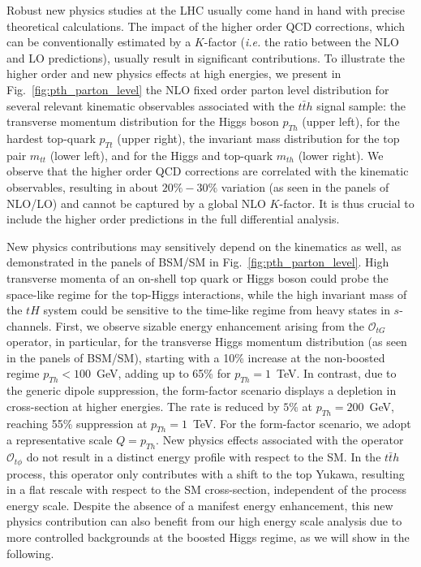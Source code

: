 \documentclass[reprint, aps,prd, preprintnumbers,groupedaddress,nofootinbib]{revtex4-1}
\begin{document}
Robust new physics studies at the LHC usually  come hand in hand with precise theoretical calculations. The impact of the  higher order QCD corrections, which  can be conventionally estimated by a $K$-factor (\emph{i.e.} the  ratio between the NLO and LO predictions), usually result in significant contributions. To illustrate the higher order and new physics effects at high energies, we present in Fig.~\ref{fig:pth_parton_level} the NLO fixed order parton level distribution for several relevant kinematic observables associated with the $t\bar{t}h$ signal sample:
the transverse momentum distribution for the Higgs boson $p_{Th}$ (upper left), for the hardest top-quark $p_{Tt}$ (upper right), the invariant mass distribution for the top pair $m_{tt}$ (lower left), and for the Higgs and  top-quark $m_{th}$ (lower right). 
%
We observe that the higher order QCD corrections are correlated with the kinematic observables, resulting in about $20\%-30\%$ variation (as seen in the panels of NLO/LO) and cannot be captured by a global NLO $K$-factor. It is thus crucial to include the higher order  predictions in the full differential analysis. 

New physics contributions may sensitively depend on the kinematics as well, as demonstrated in the panels of BSM/SM in Fig.~\ref{fig:pth_parton_level}. 
High transverse momenta of an on-shell top quark or Higgs boson could probe the space-like regime for the top-Higgs interactions, while the high invariant mass of the $tH$ system could be sensitive to the time-like regime from heavy states in $s$-channels.
First, we observe sizable energy enhancement arising from the $\mathcal{O}_{tG}$ operator, in particular, for the transverse Higgs momentum distribution (as seen in the panels of  BSM/SM), starting with a 10\%  increase at the non-boosted regime $p_{Th}<100$~GeV, adding up to 65\% for $p_{Th}=1$~TeV. In contrast, due to the generic dipole suppression, the form-factor scenario displays a depletion in cross-section at higher energies. The rate is reduced by $5\%$ at $p_{Th}=200$~GeV, reaching 55\% suppression at $p_{Th}=1$~TeV. 
For the form-factor scenario, we adopt a representative scale $Q=p_{Th}$.
New physics effects associated with the operator $\mathcal{O}_{t\phi}$ do not result in a distinct energy profile with respect to the SM. In the $t\bar{t}h$ process, this operator only contributes with a  shift to the top Yukawa, resulting in a flat rescale with respect to the SM cross-section, independent of the process energy scale. Despite the absence of a manifest energy enhancement, this new physics contribution can also benefit from our high energy scale analysis due to more controlled backgrounds at the boosted Higgs regime, as we will show in the following.
\end{document}
